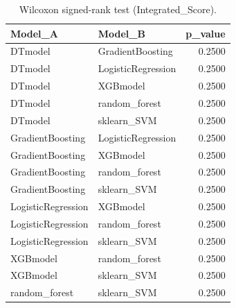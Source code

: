 \begin{table}[t]
\centering
\begin{tabular}{llr}
\toprule
Model_A & Model_B & p_value \\
\midrule
DTmodel & GradientBoosting & 0.2500 \\
DTmodel & LogisticRegression & 0.2500 \\
DTmodel & XGBmodel & 0.2500 \\
DTmodel & random_forest & 0.2500 \\
DTmodel & sklearn_SVM & 0.2500 \\
GradientBoosting & LogisticRegression & 0.2500 \\
GradientBoosting & XGBmodel & 0.2500 \\
GradientBoosting & random_forest & 0.2500 \\
GradientBoosting & sklearn_SVM & 0.2500 \\
LogisticRegression & XGBmodel & 0.2500 \\
LogisticRegression & random_forest & 0.2500 \\
LogisticRegression & sklearn_SVM & 0.2500 \\
XGBmodel & random_forest & 0.2500 \\
XGBmodel & sklearn_SVM & 0.2500 \\
random_forest & sklearn_SVM & 0.2500 \\
\bottomrule
\end{tabular}
\caption{Wilcoxon signed-rank test (Integrated_Score).}
\label{tab:wilcoxon_Integrated_Score}
\end{table}